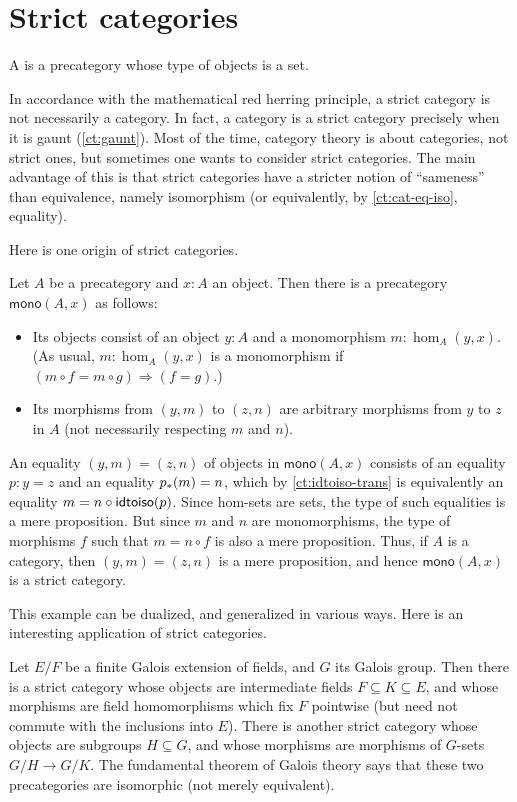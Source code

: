 \section{Strict categories}
\label{sec:strict-categories}

\begin{defn}
  A  is a precategory whose type of objects is a set.
\end{defn}

In accordance with the mathematical red herring principle, a strict category is not necessarily a category.
In fact, a category is a strict category precisely when it is gaunt (\autoref{ct:gaunt}).
Most of the time, category theory is about categories, not strict ones, but sometimes one wants to consider strict categories.
The main advantage of this is that strict categories have a stricter notion of ``sameness'' than equivalence, namely isomorphism (or equivalently, by \autoref{ct:cat-eq-iso}, equality).

Here is one origin of strict categories.

\begin{eg}
  Let $A$ be a precategory and $x:A$ an object.
  Then there is a precategory $\mathsf{mono}(A,x)$ as follows:
  \begin{itemize}
  \item Its objects consist of an object $y:A$ and a monomorphism $m:\hom_A(y,x)$.
    (As usual, $m:\hom_A(y,x)$ is a monomorphism if $(m\circ f = m\circ g) \Rightarrow (f=g)$.)
  \item Its morphisms from $(y,m)$ to $(z,n)$ are arbitrary morphisms from $y$ to $z$ in $A$ (not necessarily respecting $m$ and $n$).
  \end{itemize}
  An equality $(y,m)=(z,n)$ of objects in $\mathsf{mono}(A,x)$ consists of an equality $p:y=z$ and an equality ${p}_{*}\mathopen{}\left({m}\right)\mathclose{}=n$, which by \autoref{ct:idtoiso-trans} is equivalently an equality $m=n\circ \mathsf{idtoiso}(p)$.
  Since hom-sets are sets, the type of such equalities is a mere proposition.
  But since $m$ and $n$ are monomorphisms, the type of morphisms $f$ such that $m = n\circ f$ is also a mere proposition.
  Thus, if $A$ is a category, then $(y,m)=(z,n)$ is a mere proposition, and hence $\mathsf{mono}(A,x)$ is a strict category.
\end{eg}

This example can be dualized, and generalized in various ways.
Here is an interesting application of strict categories.

\begin{eg}\label{ct:galois}
  Let $E/F$ be a finite Galois extension of fields, and $G$ its Galois group.
  Then there is a strict category whose objects are intermediate fields $F\subseteq K\subseteq E$, and whose morphisms are field homomorphisms which fix $F$ pointwise (but need not commute with the inclusions into $E$).
  There is another strict category whose objects are subgroups $H\subseteq G$, and whose morphisms are morphisms of $G$-sets $G/H \to G/K$.
  The fundamental theorem of Galois theory says that these two precategories are isomorphic (not merely equivalent).
\end{eg}


